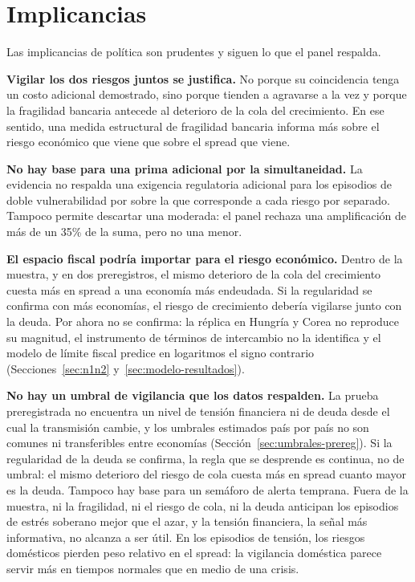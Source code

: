 \section{Implicancias}

Las implicancias de política son prudentes y siguen lo que el panel respalda.

\textbf{Vigilar los dos riesgos juntos se justifica.} No porque su coincidencia tenga un costo adicional demostrado, sino porque tienden a agravarse a la vez y porque la fragilidad bancaria antecede al deterioro de la cola del crecimiento. En ese sentido, una medida estructural de fragilidad bancaria informa más sobre el riesgo económico que viene que sobre el spread que viene.

\textbf{No hay base para una prima adicional por la simultaneidad.} La evidencia no respalda una exigencia regulatoria adicional para los episodios de doble vulnerabilidad por sobre la que corresponde a cada riesgo por separado. Tampoco permite descartar una moderada: el panel rechaza una amplificación de más de un 35\% de la suma, pero no una menor.

\textbf{El espacio fiscal podría importar para el riesgo económico.} Dentro de la muestra, y en dos preregistros, el mismo deterioro de la cola del crecimiento cuesta más en spread a una economía más endeudada. Si la regularidad se confirma con más economías, el riesgo de crecimiento debería vigilarse junto con la deuda. Por ahora no se confirma: la réplica en Hungría y Corea no reproduce su magnitud, el instrumento de términos de intercambio no la identifica y el modelo de límite fiscal predice en logaritmos el signo contrario (Secciones~\ref{sec:n1n2} y~\ref{sec:modelo-resultados}).

\textbf{No hay un umbral de vigilancia que los datos respalden.} La prueba preregistrada no encuentra un nivel de tensión financiera ni de deuda desde el cual la transmisión cambie, y los umbrales estimados país por país no son comunes ni transferibles entre economías (Sección~\ref{sec:umbrales-prereg}). Si la regularidad de la deuda se confirma, la regla que se desprende es continua, no de umbral: el mismo deterioro del riesgo de cola cuesta más en spread cuanto mayor es la deuda. Tampoco hay base para un semáforo de alerta temprana. Fuera de la muestra, ni la fragilidad, ni el riesgo de cola, ni la deuda anticipan los episodios de estrés soberano mejor que el azar, y la tensión financiera, la señal más informativa, no alcanza a ser útil. En los episodios de tensión, los riesgos domésticos pierden peso relativo en el spread: la vigilancia doméstica parece servir más en tiempos normales que en medio de una crisis.

